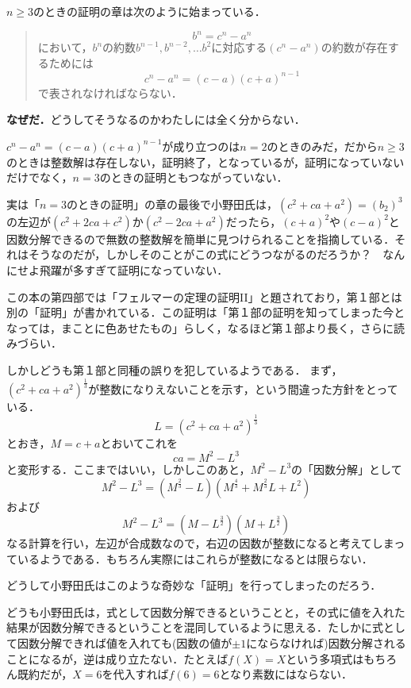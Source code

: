 $n\geq 3$のときの証明の章は次のように始まっている．

\begin{quotation}
\[b^n=c^n-a^n\]
において，$b^n$の約数$b^{n-1},b^{n-2},\dots b^2$に対応する$(c^n-a^n)$の約数が存在するためには
\[c^n-a^n=(c-a)(c+a)^{n-1}\]
で表されなければならない．
\end{quotation}

\textbf{なぜだ．}どうしてそうなるのかわたしには全く分からない．

$c^n-a^n=(c-a)(c+a)^{n-1}$が成り立つのは$n=2$のときのみだ，だから$n\geq 3$のときは整数解は存在しない，証明終了，となっているが，証明になっていないだけでなく，$n=3$のときの証明ともつながっていない．


実は「$n=3$のときの証明」の章の最後で小野田氏は，$(c^2+ca+a^2)=(b_2)^3$の左辺が$(c^2+2ca+c^2)$か$(c^2-2ca+a^2)$だったら，$(c+a)^2$や$(c-a)^2$と因数分解できるので無数の整数解を簡単に見つけられることを指摘している．それはそうなのだが，しかしそのことがこの式にどうつながるのだろうか？　なんにせよ飛躍が多すぎて証明になっていない．


この本の第四部では「フェルマーの定理の証明II」と題されており，第１部とは別の「証明」が書かれている．この証明は「第１部の証明を知ってしまった今となっては，まことに色あせたもの」らしく，なるほど第１部より長く，さらに読みづらい．

しかしどうも第１部と同種の誤りを犯しているようである．
まず，$(c^2+ca+a^2)^{\frac{1}{3}}$が整数になりえないことを示す，という間違った方針をとっている．
\[L=(c^2+ca+a^2)^{\frac{1}{3}}\]
とおき，$M=c+a$とおいてこれを
\[ca=M^2-L^3\]
と変形する．ここまではいい，しかしこのあと，$M^2-L^3$の「因数分解」として
\[M^2-L^3=(M^{\frac{2}{3}}-L)(M^{\frac{4}{3}}+M^{\frac{2}{3}}L+L^2)\]
および
\[M^2-L^3=(M-L^{\frac{3}{2}})(M+L^{\frac{3}{2}})\]
なる計算を行い，左辺が合成数なので，右辺の因数が整数になると考えてしまっているようである．もちろん実際にはこれらが整数になるとは限らない．


どうして小野田氏はこのような奇妙な「証明」を行ってしまったのだろう．

どうも小野田氏は，式として因数分解できるということと，その式に値を入れた結果が因数分解できるということを混同しているように思える．たしかに式として因数分解できれば値を入れても(因数の値が$\pm 1$にならなければ)因数分解されることになるが，逆は成り立たない．たとえば$f(X)=X$という多項式はもちろん既約だが，$X=6$を代入すれば$f(6)=6$となり素数にはならない．


